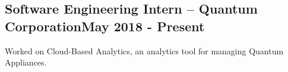 \documentclass[../Resume.tex]{subfiles}
\begin{document}
	\subsection{Software Engineering Intern -- Quantum Corporation\null\hfill May 2018 - Present}
	\par Worked on Cloud-Based Analytics, an analytics tool for managing Quantum Appliances.
	\vspace*{-2mm}
\end{document}
